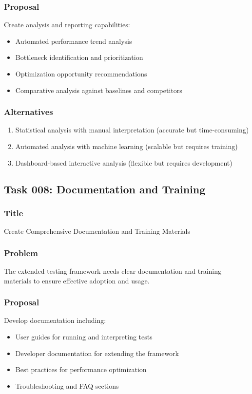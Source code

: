 \documentclass[11pt,a4paper]{article}
\begin{document}
\subsubsection{Proposal}
Create analysis and reporting capabilities:
\begin{itemize}
    \item Automated performance trend analysis
    \item Bottleneck identification and prioritization
    \item Optimization opportunity recommendations
    \item Comparative analysis against baselines and competitors
\end{itemize}

\subsubsection{Alternatives}
\begin{enumerate}
    \item Statistical analysis with manual interpretation (accurate but time-consuming)
    \item Automated analysis with machine learning (scalable but requires training)
    \item Dashboard-based interactive analysis (flexible but requires development)
\end{enumerate}

\subsection{Task 008: Documentation and Training}

\subsubsection{Title}
Create Comprehensive Documentation and Training Materials

\subsubsection{Problem}
The extended testing framework needs clear documentation and training materials to ensure effective adoption and usage.

\subsubsection{Proposal}
Develop documentation including:
\begin{itemize}
    \item User guides for running and interpreting tests
    \item Developer documentation for extending the framework
    \item Best practices for performance optimization
    \item Troubleshooting and FAQ sections
\end{itemize}
\end{document}
